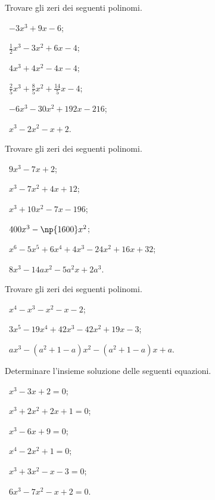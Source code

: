 \begin{esercizio}[\Ast]
 \label{ese:5.3}
Trovare gli zeri dei seguenti polinomi.
\begin{multicols}{2}
 \begin{enumeratea}
 \item~$-3x^3+9x-6$;
 \item~$\frac 1 2x^3-3x^2+6x-4$;
 \item~$4x^3+4x^2-4x-4$;
 \item~$\frac 2 5x^3+\frac 8 5x^2+\frac{14} 5x-4$;
 \item~$-6x^3-30x^2+192x-216$;
 \item~$x^3-2x^2-x+2$.
 \end{enumeratea}
 \end{multicols}
\end{esercizio}

\begin{esercizio}[\Ast]
 \label{ese:5.4}
Trovare gli zeri dei seguenti polinomi.
\begin{multicols}{2}
 \begin{enumeratea}
 \item~$9x^3-7x+2$;
 \item~$x^3-7x^2+4x+12$;
 \item~$ x^3+10x^2-7x-196 $;
 \item~$ 400x^3-\np{1600}x^2$;
 \item~$x^6-5x^5+6x^4+4x^3-24x^2+16x+32 $;
 \item~$ 8x^3-14{ax}^2-5a^2x+2a^3 $.
 \end{enumeratea}
 \end{multicols}
\end{esercizio}

\begin{esercizio}
\label{ese:5.5}
Trovare gli zeri dei seguenti polinomi.
\begin{multicols}{2}
 \begin{enumeratea}
 \item~$ x^4-x^3-x^2-x-2 $;
 \item~$ 3x^5-19x^4+42x^3-42x^2+19x-3 $;
 \item~$ {ax}^3-(a^2+1-a)x^2-(a^2+1-a)x+a $.
 \end{enumeratea}
 \end{multicols}
\end{esercizio}

\begin{esercizio}[\Ast]
\label{ese:5.6}
Determinare l'insieme soluzione delle seguenti equazioni.
\begin{multicols}{2}
 \begin{enumeratea}
 \item~$x^3-3x+2=0$;
 \item~$x^3+2x^2+2x+1=0$;
 \item~$x^3-6x+9=0$;
 \item~$x^4-2x^2+1=0$;
 \item~$x^3+3x^2-x-3=0$;
 \item~$6x^3-7x^2-x+2=0$.
 \end{enumeratea}
 \end{multicols}
\end{esercizio}

